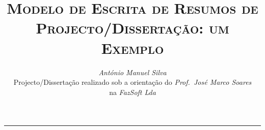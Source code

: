 \documentclass[9pt,a4paper]{extarticle}
\begin{document}
\title{\vspace*{-8mm}\textbf{\textsc{Modelo de Escrita de Resumos de\\Projecto/Dissertação: um Exemplo}}}
\author{\emph{António Manuel Silva}\\[2mm]
\small{Projecto/Dissertação realizado sob a orientação do \emph{Prof.\ José Marco Soares}}\\
\small{na \emph{FazSoft Lda}}}
\date{}
\maketitle
\thispagestyle{empty}

\vspace*{-4mm}\noindent\rule{\textwidth}{0.4pt}\vspace*{4mm}
\end{document}
